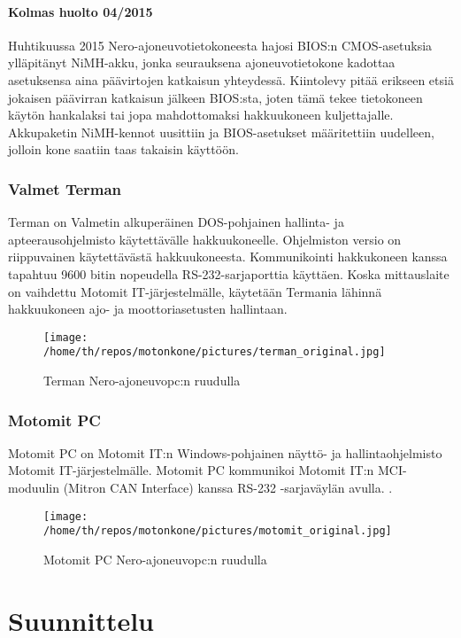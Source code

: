 \documentclass[11pt,a4paper,oneside,article]{memoir}
\begin{document}
\subsubsection{Kolmas huolto 04/2015}
Huhtikuussa 2015 Nero-ajoneuvotietokoneesta hajosi BIOS:n CMOS-asetuksia ylläpitänyt NiMH-akku, jonka seurauksena ajoneuvotietokone kadottaa asetuksensa aina päävirtojen katkaisun yhteydessä. Kiintolevy pitää erikseen etsiä jokaisen päävirran katkaisun jälkeen BIOS:sta, joten tämä tekee tietokoneen käytön hankalaksi tai jopa mahdottomaksi hakkuukoneen kuljettajalle. Akkupaketin NiMH-kennot uusittiin ja BIOS-asetukset määritettiin uudelleen, jolloin kone saatiin taas takaisin käyttöön.

\subsection{Valmet Terman}
Terman on Valmetin alkuperäinen DOS-pohjainen hallinta- ja apteerausohjelmisto käytettävälle hakkuukoneelle. Ohjelmiston versio on riippuvainen käytettävästä hakkuukoneesta. Kommunikointi hakkukoneen kanssa tapahtuu 9600 bitin nopeudella RS-232-sarjaporttia käyttäen. Koska mittauslaite on vaihdettu Motomit IT-järjestelmälle, käytetään Termania lähinnä hakkuukoneen ajo- ja moottoriasetusten hallintaan.

\begin{figure}[H]
\centering
\texttt{[image: /home/th/repos/motonkone/pictures/terman\_original.jpg]}
\caption{Terman Nero-ajoneuvopc:n ruudulla}
\end{figure}

\subsection{Motomit PC}
Motomit PC on Motomit IT:n Windows-pohjainen näyttö- ja hallintaohjelmisto Motomit IT-järjestelmälle. Motomit PC kommunikoi Motomit IT:n MCI-moduulin (Mitron CAN Interface) kanssa RS-232 -sarjaväylän avulla. \cite{motomit:esite}.

\begin{figure}[H]
\centering
\texttt{[image: /home/th/repos/motonkone/pictures/motomit\_original.jpg]}
\caption{Motomit PC Nero-ajoneuvopc:n ruudulla}
\end{figure}

\chapter{Suunnittelu}
\end{document}
